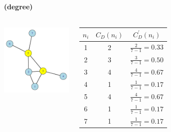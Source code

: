 \documentclass[8pt]{beamer}
\begin{document}

\begin{frame}
\frametitle{\insertsection}
\framesubtitle{\insertsubsection \hspace{0.05cm} (degree)}

\begin{columns}
	\centering 
	\includegraphics[width=5cm]{degree}
	
	\small
	\renewcommand{\arraystretch}{1.5}
	\begin{table}
	\begin{tabular}{ccc}
		\toprule
	$n_i$ & $C_D(n_i) $ & $C_D^{'}(n_i)$\\
	\hline
	1 & 2 & $\frac{2}{7-1}=0.33$\\
	2 & 3 & $\frac{3}{7-1}=0.50$\\
	3 & 4 & $\frac{4}{7-1}=0.67$\\
	4 & 1 & $\frac{1}{7-1}=0.17$\\
	5 & 4 & $\frac{4}{7-1}=0.67$\\
	6 & 1 & $\frac{1}{7-1}=0.17$\\
	7 & 1 & $\frac{1}{7-1}=0.17$\\
	\bottomrule
	\end{tabular}
	\end{table}
	
\end{columns}
\end{frame}

\end{document}
